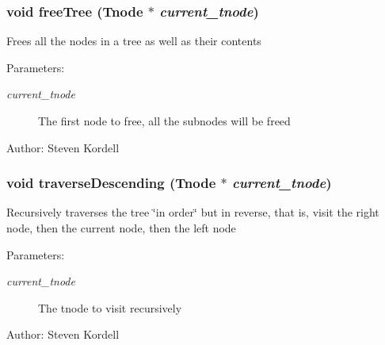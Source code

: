 \subsubsection{\setlength{\rightskip}{0pt plus 5cm}void free\-Tree (\bf{Tnode} $\ast$ {\em current\_\-tnode})}\label{tree_8h_db65a72a7751fd6dd3b6fe1683a50acf}


Frees all the nodes in a tree as well as their contents \begin{Desc}
\item[Parameters:]
\begin{description}
\item[{\em current\_\-tnode}]The first node to free, all the subnodes will be freed \end{description}
\end{Desc}
\begin{Desc}
\item[Author:]Steven Kordell \end{Desc}
\subsubsection{\setlength{\rightskip}{0pt plus 5cm}void traverse\-Descending (\bf{Tnode} $\ast$ {\em current\_\-tnode})}\label{tree_8h_344da03e1ee05b6b54d304448974ab41}


Recursively traverses the tree \char`\"{}in order\char`\"{} but in reverse, that is, visit the right node, then the current node, then the left node \begin{Desc}
\item[Parameters:]
\begin{description}
\item[{\em current\_\-tnode}]The tnode to visit recursively \end{description}
\end{Desc}
\begin{Desc}
\item[Author:]Steven Kordell \end{Desc}
